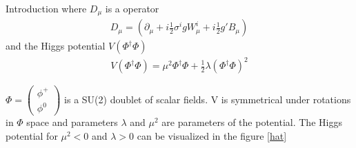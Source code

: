\begin{chapter}{Introduction}
where $D_\mu$ is a operator 
 \begin{align}
D_\mu = \left(\partial_\mu+i\frac{1}{2}\sigma^igW^i_\mu+i\frac{1}{2} g' B_\mu \right) 
 \end{align}
and the Higgs potential $V(\Phi^\dagger \Phi)$
\begin{align}
 V(\Phi^\dagger \Phi)=\mu^2 \Phi^\dagger \Phi +\frac{1}{2} \lambda (\Phi^\dagger \Phi)^2   
\end{align}

 $\Phi=\left(\begin{array}{c}
 \phi^+ \\
\phi^0
\end{array} \right) $ is a SU(2) doublet of scalar fields. V is symmetrical under rotations in $\Phi$ space
and parameters $\lambda $ and $\mu^2$ are parameters of the potential. The Higgs potential for $\mu^2 <0$ and $\lambda>0$ can be visualized in the figure \ref{hat}




\end{chapter}
